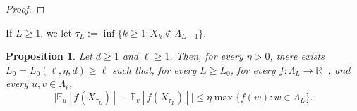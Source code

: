 \documentclass[11pt,a4paper]{article}
\numberwithin{equation}{section}
\theoremstyle{plain}
\newtheorem{Prop}[Thm]{Proposition}
\theoremstyle{definition}
\begin{document}
\begin{proof}
\end{proof}
If $L\geq 1$, we let $\tau_L:=\inf\{k\geq 1:X_k\notin \Lambda_{L-1}\}$.
\begin{Prop}\label{prop: estimates srw} Let $d\geq 1$ and $\ell\geq 1$. Then, for every $\eta>0$, there exists $L_0=L_0(\ell,\eta,d)\geq \ell$ such that, for every $L\geq L_0$, for every $f:\Lambda_L\rightarrow \mathbb R^+$, and every $u,v \in \Lambda_\ell$, 
		\begin{equation}
		\Big|\mathbb E_u[f(X_{\tau_L})]-\mathbb E_v[f(X_{\tau_L})]\Big|\leq \eta \max\{f(w):w\in \Lambda_L\}.
	\end{equation}
\end{Prop}
\end{document}
